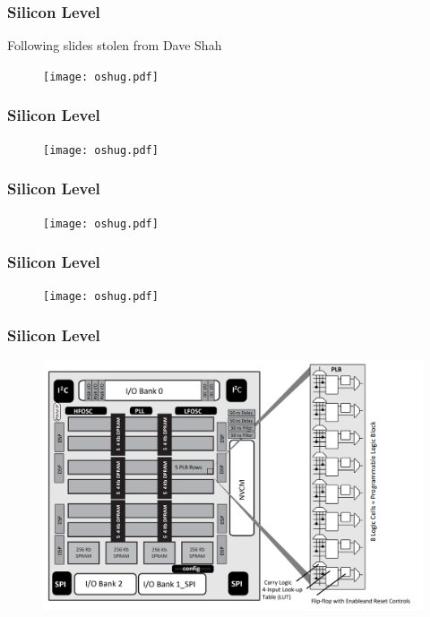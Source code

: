 \documentclass[t]{beamer}
\begin{document}
\begin{frame}[t]
	\frametitle{Silicon Level}
	Following slides stolen from Dave Shah
	\begin{figure}
		\texttt{[image: oshug.pdf]}
	\end{figure}
\end{frame}


\begin{frame}[t]
	\frametitle{Silicon Level}
	\begin{figure}
		\texttt{[image: oshug.pdf]}
	\end{figure}
\end{frame}


\begin{frame}[t]
	\frametitle{Silicon Level}
	\begin{figure}
		\texttt{[image: oshug.pdf]}
	\end{figure}
\end{frame}


\begin{frame}[t]
	\frametitle{Silicon Level}
	\begin{figure}
		\texttt{[image: oshug.pdf]}
	\end{figure}
\end{frame}


\begin{frame}[t]
	\frametitle{Silicon Level}
	\begin{figure}
		\includegraphics[width=0.9\linewidth]{ice40-internals.png}
	\end{figure}
\end{frame}
\end{document}
